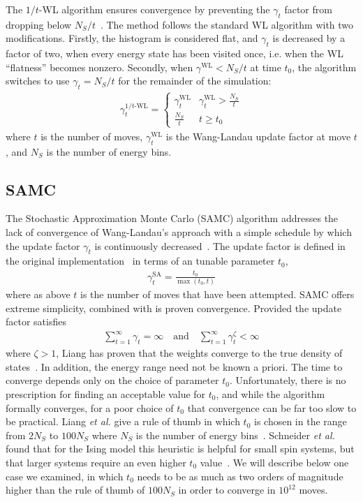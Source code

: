 \documentclass[letterpaper,twocolumn,amsmath,amssymb,pre,aps,10pt]{revtex4-1}
\begin{document}
The $1/t$-WL algorithm ensures convergence by preventing the $\gamma_t$ factor
from dropping below $N_S/t$~\cite{belardinelli2008analysis,
schneider2017convergence}. The method follows the standard WL algorithm with two
modifications.  Firstly, the histogram is considered flat, and $\gamma_t$ is
decreased by a factor of two, when every energy state has been visited once,
i.e. when the WL ``flatness'' becomes nonzero. Secondly, when
$\gamma^{\text{WL}} < N_S/t$ at time $t_0$, the algorithm switches to use
$\gamma_t = N_S/t$ for the remainder of the simulation:
\begin{align}
  \gamma_t^{1/t\text{-WL}} = \begin{cases}
     \gamma^{\text{WL}}_t & \gamma^{\text{WL}}_t > \frac{N_S}{t} \\
     \frac{N_S}{t} & t \ge t_0
 \end{cases}
\end{align}
where $t$ is the number of moves, $\gamma^{\text{WL}}_t$ is the Wang-Landau update factor
at move $t$, and $N_S$ is the number of energy bins.

\subsection{SAMC}
The Stochastic Approximation Monte Carlo (SAMC) algorithm addresses the lack of
convergence of Wang-Landau's approach with a simple schedule by which the update
factor $\gamma_t$ is continuously decreased~\cite{liang2007stochastic,
werlich2015stochastic, schneider2017convergence}.  The update factor is defined
in the original implementation~\cite{liang2007stochastic} in terms of an tunable
parameter $t_0$,
\begin{align}
\gamma_{t}^{\text{SA}} =\frac{t_0}{\max(t_0,t)}\label{eq:1}
\end{align}
where as above $t$ is the number of moves that have been attempted.
SAMC offers extreme simplicity, combined with is proven convergence.
Provided the update factor satisfies
\begin{align}
\sum_{t=1}^\infty \gamma_{t} = \infty \quad\textrm{and}\quad
\sum_{t=1}^\infty \gamma_{t}^\zeta < \infty
\end{align}
where $\zeta > 1$, Liang has proven that the weights converge to the true
density of states~\cite{liang2006theory, liang2007stochastic,
liang2009improving}.  In addition, the energy range need not be known a priori.
The time to converge depends only on the choice of parameter $t_0$.
Unfortunately, there is no prescription for finding an acceptable value for
$t_0$, and while the algorithm formally converges, for a poor choice of $t_0$
that convergence can be far too slow to be practical. Liang \emph{et al.} give a
rule of thumb in which $t_0$ is chosen in the range from $2N_S$ to $100N_S$
where $N_S$ is the number of energy bins~\cite{liang2007stochastic}. Schneider
\emph{et al.} found that for the Ising model this heuristic is helpful for small
spin systems, but that larger systems require an even higher $t_0$
value~\cite{schneider2017convergence}.  We will describe below one case we
examined, in which $t_0$ needs to be as much as two orders of magnitude higher
than the rule of thumb of $100N_S$ in order to converge in $10^{12}$ moves.
\end{document}
